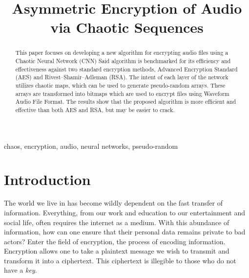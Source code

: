 \documentclass[conference]{IEEEtran}
\begin{document}
\title{Asymmetric Encryption of Audio via Chaotic Sequences}

\author{
}

\maketitle

\begin{abstract}
This paper focuses on developing a new algorithm for encrypting audio files using a Chaotic Neural Network (CNN)
Said algorithm is benchmarked for its efficiency and effectiveness against two standard encryption methods, Advanced Encryption Standard (AES) and Rivest–Shamir–Adleman (RSA).
The intent of each layer of the network utilizes chaotic maps, which can be used to generate pseudo-random arrays.
These arrays are transformed into bitmaps which are used to encrypt files using Waveform Audio File Format.
The results show that the proposed algorithm is more efficient and effective than both AES and RSA, but may be easier to crack.
\end{abstract}

\begin{IEEEkeywords}
chaos, encryption, audio, neural networks, pseudo-random
\end{IEEEkeywords}

\section{Introduction}\label{sec:introduction}
The world we live in has become wildly dependent on the fast transfer of information.
Everything, from our work and education to our entertainment and social life, often requires the internet as a medium.
With this abundance of information, how can one ensure that their personal data remains private to bad actors?
Enter the field of encryption, the process of encoding information.
Encryption allows one to take a plaintext message we wish to transmit and transform it into a ciphertext.
This ciphertext is illegible to those who do not have a \textit{key}.
\end{document}
